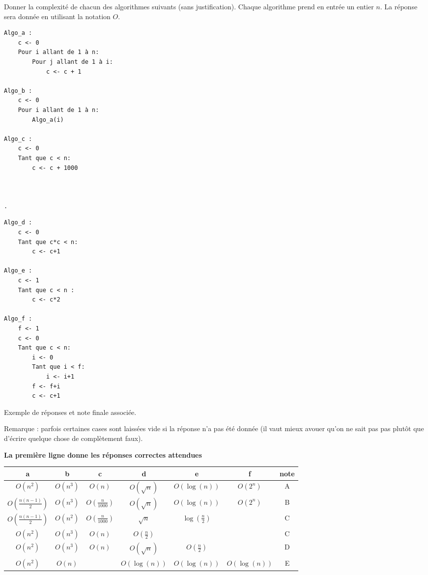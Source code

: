 
\begin{exercice}

Donner la complexité de chacun des algorithmes suivants (sans justification). Chaque algorithme 
prend en entrée un entier $n$. La réponse sera donnée en utilisant la notation $O$.

\begin{minipage}[t]{0.48 \textwidth}
\begin{lstlisting}
Algo_a :
    c <- 0
    Pour i allant de 1 à n:
        Pour j allant de 1 à i:
            c <- c + 1
            
Algo_b :
    c <- 0
    Pour i allant de 1 à n:
        Algo_a(i)
        
Algo_c :
    c <- 0
    Tant que c < n:
        c <- c + 1000
        
        
        
.        
\end{lstlisting}
\end{minipage}
\begin{minipage}[t]{0.48 \textwidth}
\begin{lstlisting}
Algo_d :
    c <- 0
    Tant que c*c < n:
        c <- c+1

Algo_e :
    c <- 1
    Tant que c < n :
        c <- c*2
        
Algo_f :
    f <- 1
    c <- 0
    Tant que c < n:
        i <- 0
        Tant que i < f:
            i <- i+1
        f <- f+i
        c <- c+1
\end{lstlisting}
\end{minipage}

Exemple de réponses et note finale associée. 

Remarque : parfois certaines cases sont laissées vide si la réponse n'a pas été donnée (il vaut mieux avouer
qu'on ne sait pas pas plutôt que d'écrire quelque chose de complètement faux).

\textbf{La première ligne donne les réponses correctes attendues}

\begin{tabular}{|c|c|c|c|c|c|c|}
\hline 
a & b & c & d & e & f & note \\ \hline
$O(n^2)$ & $O(n^3)$ & $O(n)$ & $O(\sqrt{n})$ & $O(\log(n))$ & $O(2^n)$ & A \\ \hline \hline
$O(\frac{n(n-1)}{2})$ & $O(n^3)$ & $O(\frac{n}{1000})$ & $O(\sqrt{n})$ & $O(\log(n))$ & $O(2^n)$ & B \\ \hline
$O(\frac{n(n-1)}{2})$ & $O(n^2)$ & $O(\frac{n}{1000})$ & $\sqrt{n}$ & $\log(\frac{n}{2})$ &  & C \\ \hline
$O(n^2)$ & $O(n^3)$ & $O(n)$ & $O(\frac{n}{2})$ & &  & C \\ \hline
$O(n^2)$ & $O(n^3)$ & $O(n)$ & $O(\sqrt{n})$ & $O(\frac{n}{2})$ &  & D \\ \hline
$O(n^2)$ & $O(n)$ &  & $O(\log(n))$ & $O(\log(n))$ & $O(\log(n))$ & E \\ \hline
\end{tabular}


\end{exercice}